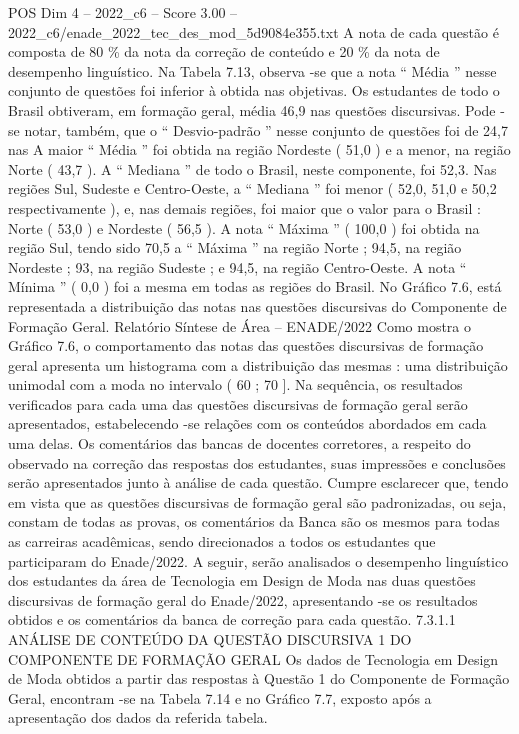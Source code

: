 \begin{textsample}{POS Dim 4 – 2022\_c6 – Score 3.00 – 2022\_c6/enade\_2022\_tec\_des\_mod\_5d9084e355.txt}
A nota de cada questão é composta de 80 \% da nota da correção de conteúdo e 20 \% da nota de desempenho linguístico.
Na Tabela 7.13, observa -se que a nota “ Média ” nesse conjunto de questões foi inferior à obtida nas objetivas.
Os estudantes de todo o Brasil obtiveram, em formação geral, média 46,9 nas questões discursivas.
Pode -se notar, também, que o “ Desvio-padrão ” nesse conjunto de questões foi de 24,7 nas A maior “ Média ” foi obtida na região Nordeste ( 51,0 ) e a menor, na região Norte ( 43,7 ).
A “ Mediana ” de todo o Brasil, neste componente, foi 52,3.
Nas regiões Sul, Sudeste e Centro-Oeste, a “ Mediana ” foi menor ( 52,0, 51,0 e 50,2 respectivamente ), e, nas demais regiões, foi maior que o valor para o Brasil : Norte ( 53,0 ) e Nordeste ( 56,5 ).
A nota “ Máxima ” ( 100,0 ) foi obtida na região Sul, tendo sido 70,5 a “ Máxima ” na região Norte ; 94,5, na região Nordeste ; 93, na região Sudeste ; e 94,5, na região Centro-Oeste.
A nota “ Mínima ” ( 0,0 ) foi a mesma em todas as regiões do Brasil.
No Gráfico 7.6, está representada a distribuição das notas nas questões discursivas do Componente de Formação Geral.
Relatório Síntese de Área – ENADE/2022 Como mostra o Gráfico 7.6, o comportamento das notas das questões discursivas de formação geral apresenta um histograma com a distribuição das mesmas : uma distribuição unimodal com a moda no intervalo ( 60 ; 70 ].
Na sequência, os resultados verificados para cada uma das questões discursivas de formação geral serão apresentados, estabelecendo -se relações com os conteúdos abordados em cada uma delas.
Os comentários das bancas de docentes corretores, a respeito do observado na correção das respostas dos estudantes, suas impressões e conclusões serão apresentados junto à análise de cada questão.
Cumpre esclarecer que, tendo em vista que as questões discursivas de formação geral são padronizadas, ou seja, constam de todas as provas, os comentários da Banca são os mesmos para todas as carreiras acadêmicas, sendo direcionados a todos os estudantes que participaram do Enade/2022.
A seguir, serão analisados o desempenho linguístico dos estudantes da área de Tecnologia em Design de Moda nas duas questões discursivas de formação geral do Enade/2022, apresentando -se os resultados obtidos e os comentários da banca de correção para cada questão. 7.3.1.1 ANÁLISE DE CONTEÚDO DA QUESTÃO DISCURSIVA 1 DO COMPONENTE DE FORMAÇÃO GERAL Os dados de Tecnologia em Design de Moda obtidos a partir das respostas à Questão 1 do Componente de Formação Geral, encontram -se na Tabela 7.14 e no Gráfico 7.7, exposto após a apresentação dos dados da referida tabela.

\end{textsample}
